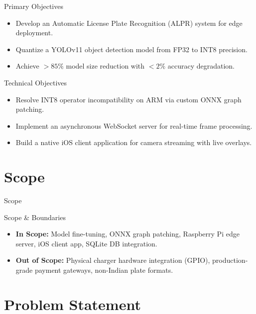 \documentclass{beamer}
\begin{document}
\begin{frame}{Primary Objectives}
\begin{itemize}
    \item Develop an Automatic License Plate Recognition (ALPR) system for edge deployment.
    \item Quantize a YOLOv11 object detection model from FP32 to INT8 precision.
    \item Achieve $>85\%$ model size reduction with $<2\%$ accuracy degradation.
\end{itemize}
\end{frame}

\begin{frame}{Technical Objectives}
\begin{itemize}
    \item Resolve INT8 operator incompatibility on ARM via custom ONNX graph patching.
    \item Implement an asynchronous WebSocket server for real-time frame processing.
    \item Build a native iOS client application for camera streaming with live overlays.
\end{itemize}
\end{frame}

\section{Scope}

\begin{frame}
    \centering
    \Huge Scope
\end{frame}

\begin{frame}{Scope \& Boundaries}
\begin{itemize}
    \item \textbf{In Scope:} Model fine-tuning, ONNX graph patching, Raspberry Pi edge server, iOS client app, SQLite DB integration.
    \item \textbf{Out of Scope:} Physical charger hardware integration (GPIO), production-grade payment gateways, non-Indian plate formats.
\end{itemize}
\end{frame}

\section{Problem Statement}
\end{document}
